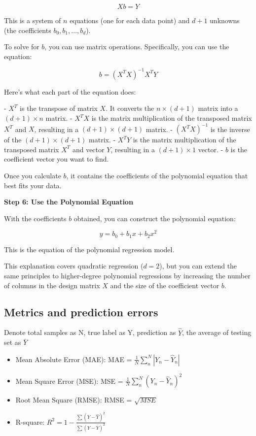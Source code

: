 \documentclass[letterpaper,12pt]{article}
\begin{document}
\[
    Xb = Y
\]

This is a system of $n$ equations (one for each data point) and $d+1$ unknowns
(the coefficients $b_0, b_1, \ldots, b_d$).

To solve for $b$, you can use matrix operations. Specifically, you can use the
equation:

\[
    b = (X^TX)^{-1}X^TY
\]

Here's what each part of the equation does:

- $X^T$ is the transpose of matrix $X$. It converts the $n \times (d+1)$ matrix into a $(d+1) \times n$ matrix.
- $X^TX$ is the matrix multiplication of the transposed matrix $X^T$ and $X$, resulting in a $(d+1) \times (d+1)$ matrix.
- $(X^TX)^{-1}$ is the inverse of the $(d+1) \times (d+1)$ matrix.
- $X^TY$ is the matrix multiplication of the transposed matrix $X^T$ and vector $Y$, resulting in a $(d+1) \times 1$ vector.
- $b$ is the coefficient vector you want to find.

Once you calculate $b$, it contains the coefficients of the polynomial equation
that best fits your data.

\textbf{Step 6: Use the Polynomial Equation}

With the coefficients $b$ obtained, you can construct the polynomial equation:

\[
    y = b_0 + b_1x + b_2x^2
\]

This is the equation of the polynomial regression model.

This explanation covers quadratic regression ($d=2$), but you can extend the
same principles to higher-degree polynomial regressions by increasing the
number of columns in the design matrix $X$ and the size of the coefficient
vector $b$.

\subsection{Metrics and prediction errors}

Denote total samples as N, true label as Y, prediction as $\hat{Y}$, the
average of testing set as $\bar{Y}$

\begin{itemize}
    \item Mean Absolute Error (MAE): MAE = $\frac{1}{N}\sum_{n}^{N}|Y_n-\hat{Y}_n|$
    \item Mean Square Error (MSE): MSE = $\frac{1}{N}\sum_{n}^{N}(Y_n-\hat{Y}_n)^2$
    \item Root Mean Square (RMSE): RMSE = $\sqrt{MSE}$
    \item R-square: $R^2 = 1 - \frac{\sum{(Y-\hat{Y})^2}}{\sum{(Y-\bar{Y})^2}}$
\end{itemize}
\end{document}
